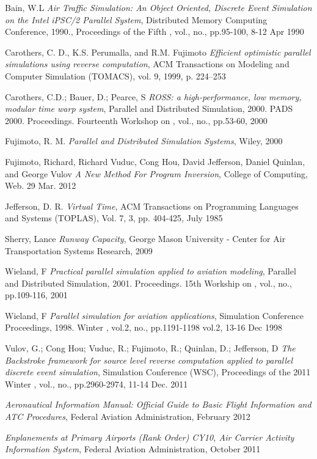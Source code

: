 \begin{thebibliography}{1}

    Bain, W.L
   {\em Air Traffic Simulation: An Object Oriented, Discrete Event Simulation on the Intel iPSC/2 Parallel System},
	Distributed Memory Computing Conference, 1990., Proceedings of the Fifth , vol., no., pp.95-100, 8-12 Apr 1990

   Carothers, C. D., K.S. Perumalla, and R.M. Fujimoto
   {\em Efficient optimistic parallel simulations using reverse computation},
   ACM Transactions on Modeling and Computer Simulation (TOMACS), vol. 9, 1999, p. 224–253

    Carothers, C.D.; Bauer, D.; Pearce, S
   {\em ROSS: a high-performance, low memory, modular time warp system},
	Parallel and Distributed Simulation, 2000. PADS 2000. Proceedings. Fourteenth Workshop on , vol., no., pp.53-60, 2000     

   Fujimoto, R. M. 
   {\em Parallel and Distributed Simulation Systems},
	Wiley, 2000

    Fujimoto, Richard, Richard Vuduc, Cong Hou, David Jefferson, Daniel Quinlan, and George Vulov
   {\em A New Method For Program Inversion},
   College of Computing, Web. 29 Mar. 2012

   Jefferson, D. R.
   {\em Virtual Time},
   ACM Transactions on Programming Languages and Systems (TOPLAS), Vol. 7, 3, pp. 404-425, July 1985
  
    Sherry, Lance
   {\em Runway Capacity},
   George Mason University - Center for Air Transportation Systems Research, 2009
  
    Wieland, F
   {\em Practical parallel simulation applied to aviation modeling},
	Parallel and Distributed Simulation, 2001. Proceedings. 15th Workship on , vol., no., pp.109-116, 2001   

    Wieland, F
   {\em Parallel simulation for aviation applications},
	Simulation Conference Proceedings, 1998. Winter , vol.2, no., pp.1191-1198 vol.2, 13-16 Dec 1998

    Vulov, G.; Cong Hou; Vuduc, R.; Fujimoto, R.; Quinlan, D.; Jefferson, D
   {\em The Backstroke framework for source level reverse computation applied to parallel discrete event simulation},
	Simulation Conference (WSC), Proceedings of the 2011 Winter , vol., no., pp.2960-2974, 11-14 Dec. 2011

   {\em Aeronautical Information Manual: Official Guide to Basic Flight Information and ATC Procedures},
	Federal Aviation Administration, February 2012  
	
   {\em Enplanements at Primary Airports (Rank Order) CY10, Air Carrier Activity Information System},
	Federal Aviation Administration, October 2011
   
  \end{thebibliography}